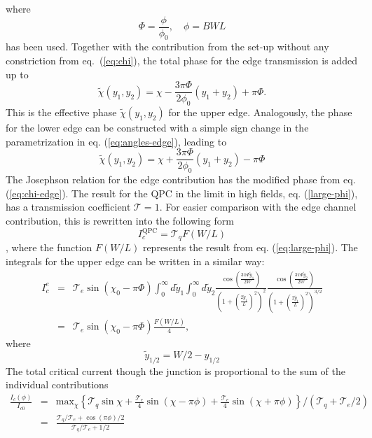 where
\begin{equation}
\Phi = \frac{\phi}{\phi_0}, \quad \phi = B W L
\end{equation}
has been used. Together with the contribution from the set-up without any constriction from eq.~(\ref{eq:chi}), the total phase for the edge transmission is added up to
\begin{equation}
\tilde{\chi}(y_1, y_2) = \chi - \frac{3 \pi \Phi}{2\phi_0} (y_1 + y_2) + \pi \Phi \label{eq:chi-edge}.
\end{equation}
This is the effective phase $\tilde{\chi}(y_1, y_2)$ for the upper edge. Analogously, the phase for the lower edge can be constructed with a simple sign change in the parametrization in eq. (\ref{eq:angles-edge}), leading to
\begin{equation}
\tilde{\chi}(y_1, y_2) = \chi + \frac{3 \pi \Phi}{2\phi_0} (y_1 + y_2) - \pi \Phi \label{eq:chi-edge}
\end{equation}
The Josephson relation for the edge contribution has the modified phase from eq. (\ref{eq:chi-edge}). 
The result for the QPC in the limit in high fields, eq. (\ref{large-phi}), has a transmission coefficient $\mathcal{T} = 1$. For easier comparison with the edge channel contribution, this is rewritten into the following form
\begin{equation}
I_c^{\text{QPC}} = \mathcal{T}_q F(W/L)
\end{equation},
where the function $F(W/L)$ represents the result from eq. (\ref{eq:large-phi}). The integrals for the upper edge can be written in a similar way:
\begin{eqnarray}
I_c^e &=& \mathcal{T}_e \sin \left( \chi_0 - \pi \Phi \right) \int_0^\infty d \tilde{y}_1 \int_0^\infty d \tilde{y}_2 \frac{\cos \left( \frac{3 \pi \Phi \tilde{y}_1}{2 W} \right) }{\left( 1 + \left( \frac{2 \tilde{y}_1}{L}\right)^2 \right)^2} \frac{\cos \left( \frac{3 \pi \Phi \tilde{y}_2}{2 W} \right)}{\left( 1 + \left( \frac{2 \tilde{y}_1}{L}\right)^2 \right)^{3/2}} \\
&=& \mathcal{T}_e \sin \left( \chi_0 - \pi \Phi \right) \frac{F(W/L)}{4}, 
\end{eqnarray}
where
\begin{equation}
\tilde{y}_{1/2} = W/2 - y_{1/2} 
\end{equation}
The total critical current though the junction is proportional to the sum of the individual contributions
\begin{eqnarray}
\frac{I_c\left( \phi \right)}{I_{c0}} &=& \text{max}_\chi \left\{ \mathcal{T}_q \sin \chi + \frac{\mathcal{T}_e}{4} \sin \left( \chi - \pi \phi \right) + \frac{\mathcal{T}_e}{4} \sin \left( \chi + \pi \phi \right) \right\} / \left( \mathcal{T}_q + \mathcal{T}_e/2 \right)\\
&=& \frac{\mathcal{T}_q / \mathcal{T}_e + \cos \left( \pi \phi \right)/ 2 }{\mathcal{T}_q / \mathcal{T}_e + 1/2}\label{eq:ratio-transmissions}
\end{eqnarray}
